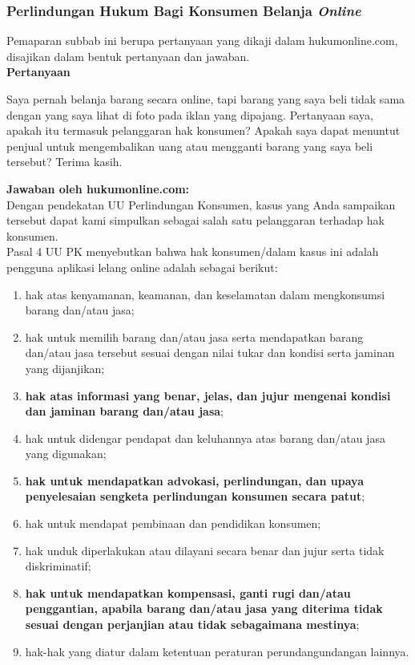 \subsubsection{Perlindungan Hukum Bagi Konsumen Belanja \textit{Online}}
	Pemaparan subbab ini berupa pertanyaan yang dikaji dalam hukumonline.com, disajikan dalam bentuk pertanyaan dan jawaban.\\
\textbf{Pertanyaan}
\begin{displayquote}
	Saya pernah belanja barang secara online, tapi barang yang saya beli tidak sama dengan yang saya lihat di foto pada iklan yang dipajang. Pertanyaan saya, apakah itu termasuk pelanggaran hak konsumen? Apakah saya dapat menuntut penjual untuk mengembalikan uang atau mengganti barang yang saya beli tersebut? Terima kasih.
\end{displayquote}

\textbf{Jawaban oleh hukumonline.com:}\\
\indent Dengan pendekatan UU Perlindungan Konsumen, kasus yang Anda sampaikan tersebut dapat kami simpulkan sebagai salah satu pelanggaran terhadap hak konsumen. \\
\indent Pasal 4 UU PK menyebutkan bahwa hak konsumen/dalam kasus ini adalah pengguna aplikasi lelang online adalah sebagai berikut:
\begin{enumerate}[label=\alph*.]
	\item hak atas kenyamanan, keamanan, dan keselamatan dalam mengkonsumsi barang dan/atau jasa;
	\item hak untuk memilih barang dan/atau jasa serta mendapatkan barang dan/atau jasa tersebut sesuai dengan nilai tukar dan kondisi serta jaminan yang dijanjikan;
	\item \textbf{hak atas informasi yang benar, jelas, dan jujur mengenai kondisi dan jaminan barang dan/atau jasa};
	\item hak untuk didengar pendapat dan keluhannya atas barang dan/atau jasa yang digunakan;
	\item \textbf{hak untuk mendapatkan advokasi, perlindungan, dan upaya penyelesaian sengketa perlindungan konsumen secara patut};
	\item hak untuk mendapat pembinaan dan pendidikan konsumen;
	\item hak unduk diperlakukan atau dilayani secara benar dan jujur serta tidak diskriminatif;
	\item \textbf{hak untuk mendapatkan kompensasi, ganti rugi dan/atau penggantian, apabila barang dan/atau jasa yang diterima tidak sesuai dengan perjanjian atau tidak sebagaimana mestinya};
	\item hak-hak yang diatur dalam ketentuan peraturan perundangundangan lainnya.
\end{enumerate}

